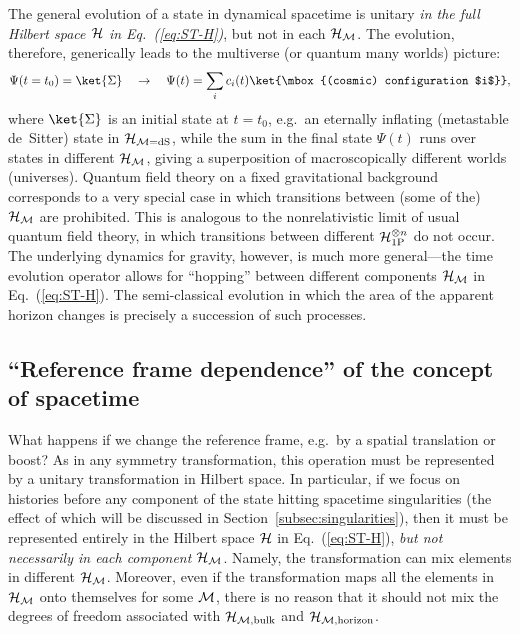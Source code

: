 \documentclass[12pt]{article}
\begin{document}
The general evolution of a state in dynamical spacetime is unitary 
{\it in the full Hilbert space ${\cal H}$ in Eq.~(\ref{eq:ST-H})}, but 
not in each ${\cal H}_{\cal M}$.  The evolution, therefore, generically 
leads to the multiverse (or quantum many worlds) picture:
%
\begin{equation}
  \Psi(t = t_0) = \ket{\Sigma}
\quad\rightarrow\quad
  \Psi(t) = \sum_i c_i(t) \ket{\mbox{(cosmic) configuration $i$}},
\label{eq:multiverse-evolution}
\end{equation}
%
where $\ket{\Sigma}$ is an initial state at $t = t_0$, e.g.\ an eternally 
inflating (metastable de~Sitter) state in ${\cal H}_{{\cal M} = {\rm dS}}$, 
while the sum in the final state $\Psi(t)$ runs over states in different 
${\cal H}_{\cal M}$, giving a superposition of macroscopically different 
worlds (universes).  Quantum field theory on a fixed gravitational 
background corresponds to a very special case in which transitions between 
(some of the) ${\cal H}_{\cal M}$ are prohibited.  This is analogous 
to the nonrelativistic limit of usual quantum field theory, in which 
transitions between different ${\cal H}_{\rm 1P}^{\otimes n}$ do not 
occur.  The underlying dynamics for gravity, however, is much more 
general---the time evolution operator allows for ``hopping'' between 
different components ${\cal H}_{\cal M}$ in Eq.~(\ref{eq:ST-H}).  The 
semi-classical evolution in which the area of the apparent horizon 
changes is precisely a succession of such processes.


\subsection{``Reference frame dependence'' of the concept of spacetime}
\label{subsec:frame-change}

What happens if we change the reference frame, e.g.\ by a spatial 
translation or boost?  As in any symmetry transformation, this operation 
must be represented by a unitary transformation in Hilbert space. 
In particular, if we focus on histories before any component of the 
state hitting spacetime singularities (the effect of which will be 
discussed in Section~\ref{subsec:singularities}), then it must be 
represented entirely in the Hilbert space ${\cal H}$ in Eq.~(\ref{eq:ST-H}), 
{\it but not necessarily in each component ${\cal H}_{\cal M}$}.  Namely, 
the transformation can mix elements in different ${\cal H}_{\cal M}$. 
Moreover, even if the transformation maps all the elements in 
${\cal H}_{\cal M}$ onto themselves for some ${\cal M}$, there is 
no reason that it should not mix the degrees of freedom associated with 
${\cal H}_{{\cal M}, {\rm bulk}}$ and ${\cal H}_{{\cal M}, {\rm horizon}}$.
\end{document}
